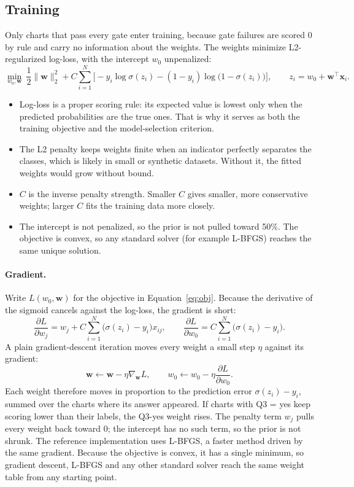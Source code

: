 \documentclass[10pt,letterpaper]{article}
\begin{document}
\FloatBarrier
\subsection{Training}

Only charts that pass every gate enter training, because gate failures are scored 0 by rule and carry no information about the weights. The weights minimize L2-regularized log-loss, with the intercept $w_0$ unpenalized:
\begin{equation}\label{eq:obj}
\min_{w_0,\mathbf{w}}\ \frac12\|\mathbf{w}\|_2^2 + C\sum_{i=1}^{N}\Big[-y_i\log\sigma(z_i)-(1-y_i)\log\big(1-\sigma(z_i)\big)\Big],\qquad z_i=w_0+\mathbf{w}^\top\mathbf{x}_i.
\end{equation}
\begin{itemize}
  \item Log-loss is a proper scoring rule: its expected value is lowest only when the predicted probabilities are the true ones. That is why it serves as both the training objective and the model-selection criterion.
  \item The L2 penalty keeps weights finite when an indicator perfectly separates the classes, which is likely in small or synthetic datasets. Without it, the fitted weights would grow without bound.
  \item $C$ is the inverse penalty strength. Smaller $C$ gives smaller, more conservative weights; larger $C$ fits the training data more closely.
  \item The intercept is not penalized, so the prior is not pulled toward 50\%. The objective is convex, so any standard solver (for example L-BFGS) reaches the same unique solution.
\end{itemize}

\paragraph{Gradient.} Write $L(w_0,\mathbf{w})$ for the objective in Equation~\eqref{eq:obj}. Because the derivative of the sigmoid cancels against the log-loss, the gradient is short:
\begin{equation}
\frac{\partial L}{\partial w_j}=w_j+C\sum_{i=1}^{N}\big(\sigma(z_i)-y_i\big)x_{ij},\qquad
\frac{\partial L}{\partial w_0}=C\sum_{i=1}^{N}\big(\sigma(z_i)-y_i\big).
\end{equation}
A plain gradient-descent iteration moves every weight a small step $\eta$ against its gradient:
\begin{equation}
\mathbf{w}\gets\mathbf{w}-\eta\nabla_{\mathbf{w}}L,\qquad w_0\gets w_0-\eta\frac{\partial L}{\partial w_0}.
\end{equation}
Each weight therefore moves in proportion to the prediction error $\sigma(z_i)-y_i$, summed over the charts where its answer appeared. If charts with Q3 = yes keep scoring lower than their labels, the Q3-yes weight rises. The penalty term $w_j$ pulls every weight back toward 0; the intercept has no such term, so the prior is not shrunk. The reference implementation uses L-BFGS, a faster method driven by the same gradient. Because the objective is convex, it has a single minimum, so gradient descent, L-BFGS and any other standard solver reach the same weight table from any starting point.
\end{document}
